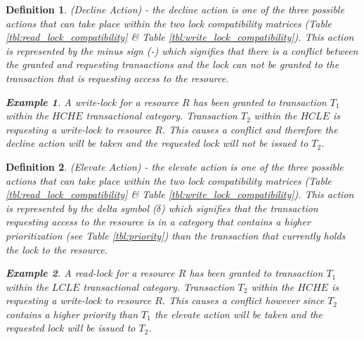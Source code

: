 \documentclass[conference]{IEEEtran}
\newtheorem{definition}{Definition}
\newtheorem{example}{Example}[definition]
\begin{document}
\begin{definition}
\label{decline_action}
 (Decline Action) - the decline action is one of the three possible actions that can take place within the two lock compatibility matrices (Table \ref{tbl:read_lock_compatibility} \& Table \ref{tbl:write_lock_compatibility}). This action is represented by the minus sign (-) which signifies that there is a conflict between the granted and requesting transactions and the lock can not be granted to the transaction that is requesting access to the resource.
 
 \begin{example}
 \label{ex_decline_action}
  A write-lock for a resource $R$ has been granted to transaction $T_{1}$ within the $HCHE$ transactional category. Transaction $T_{2}$ within the $HCLE$ is requesting a write-lock to resource $R$. This causes a conflict and therefore the decline action will be taken and the requested lock will not be issued to $T_{2}$.
 \end{example}
 
\end{definition}

\begin{definition}
\label{elevate_action}
 (Elevate Action) - the elevate action is one of the three possible actions that can take place within the two lock compatibility matrices (Table \ref{tbl:read_lock_compatibility} \& Table \ref{tbl:write_lock_compatibility}). This action is represented by the delta symbol ($\delta$) which signifies that the transaction requesting access to the resource is in a category that contains a higher prioritization (see Table \ref{tbl:priority}) than the transaction that currently holds the lock to the resource.
 
 \begin{example}
 \label{ex_elevate_action}
  A read-lock for a resource $R$ has been granted to transaction $T_{1}$ within the $LCLE$ transactional category. Transaction $T_{2}$ within the $HCHE$ is requesting a write-lock to resource $R$. This causes a conflict however since $T_{2}$ contains a higher priority than $T_{1}$ the elevate action will be taken and the requested lock will be issued to $T_{2}$.
 \end{example}
 
\end{definition}
\end{document}
